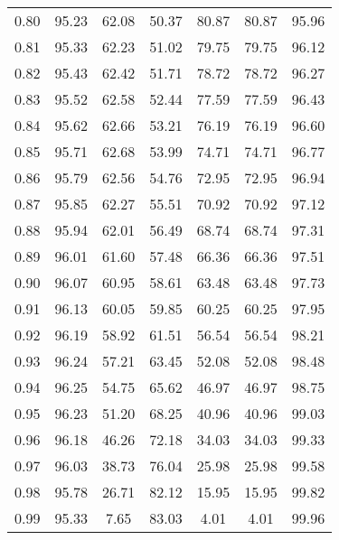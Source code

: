 \begin{tabular}{|c|c|c|c|c|c|c|}
      0.80 &     95.23 &     62.08 &      50.37 &   80.87 &      80.87 &         95.96 \\
      0.81 &     95.33 &     62.23 &      51.02 &   79.75 &      79.75 &         96.12 \\
      0.82 &     95.43 &     62.42 &      51.71 &   78.72 &      78.72 &         96.27 \\
      0.83 &     95.52 &     62.58 &      52.44 &   77.59 &      77.59 &         96.43 \\
      0.84 &     95.62 &     62.66 &      53.21 &   76.19 &      76.19 &         96.60 \\
      0.85 &     95.71 &     62.68 &      53.99 &   74.71 &      74.71 &         96.77 \\
      0.86 &     95.79 &     62.56 &      54.76 &   72.95 &      72.95 &         96.94 \\
      0.87 &     95.85 &     62.27 &      55.51 &   70.92 &      70.92 &         97.12 \\
      0.88 &     95.94 &     62.01 &      56.49 &   68.74 &      68.74 &         97.31 \\
      0.89 &     96.01 &     61.60 &      57.48 &   66.36 &      66.36 &         97.51 \\
      0.90 &     96.07 &     60.95 &      58.61 &   63.48 &      63.48 &         97.73 \\
      0.91 &     96.13 &     60.05 &      59.85 &   60.25 &      60.25 &         97.95 \\
      0.92 &     96.19 &     58.92 &      61.51 &   56.54 &      56.54 &         98.21 \\
      0.93 &     96.24 &     57.21 &      63.45 &   52.08 &      52.08 &         98.48 \\
      0.94 &     96.25 &     54.75 &      65.62 &   46.97 &      46.97 &         98.75 \\
      0.95 &     96.23 &     51.20 &      68.25 &   40.96 &      40.96 &         99.03 \\
      0.96 &     96.18 &     46.26 &      72.18 &   34.03 &      34.03 &         99.33 \\
      0.97 &     96.03 &     38.73 &      76.04 &   25.98 &      25.98 &         99.58 \\
      0.98 &     95.78 &     26.71 &      82.12 &   15.95 &      15.95 &         99.82 \\
      0.99 &     95.33 &      7.65 &      83.03 &    4.01 &       4.01 &         99.96 \\
\bottomrule
\end{tabular}
